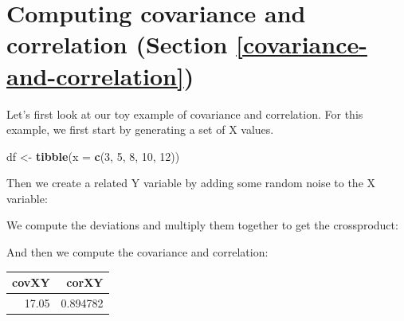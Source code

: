 \documentclass[12pt,]{book}
\newenvironment{Shaded}{\begin{snugshade}}{\end{snugshade}}
\newcommand{\DataTypeTok}[1]{\textcolor[rgb]{0.13,0.29,0.53}{#1}}
\newcommand{\DecValTok}[1]{\textcolor[rgb]{0.00,0.00,0.81}{#1}}
\newcommand{\KeywordTok}[1]{\textcolor[rgb]{0.13,0.29,0.53}{\textbf{#1}}}
\newcommand{\NormalTok}[1]{#1}
\newcommand{\OperatorTok}[1]{\textcolor[rgb]{0.81,0.36,0.00}{\textbf{#1}}}
\newcommand{\StringTok}[1]{\textcolor[rgb]{0.31,0.60,0.02}{#1}}
\begin{document}
\hypertarget{computing-covariance-and-correlation-section-refcovariance-and-correlation}{%
\section{Computing covariance and correlation (Section \ref{covariance-and-correlation})}\label{computing-covariance-and-correlation-section-refcovariance-and-correlation}}

Let's first look at our toy example of covariance and correlation. For this example, we first start by generating a set of X values.

\begin{Shaded}
\begin{Highlighting}[]
\NormalTok{df <-}
\StringTok{  }\KeywordTok{tibble}\NormalTok{(}\DataTypeTok{x =} \KeywordTok{c}\NormalTok{(}\DecValTok{3}\NormalTok{, }\DecValTok{5}\NormalTok{, }\DecValTok{8}\NormalTok{, }\DecValTok{10}\NormalTok{, }\DecValTok{12}\NormalTok{))}
\end{Highlighting}
\end{Shaded}

Then we create a related Y variable by adding some random noise to the X variable:

We compute the deviations and multiply them together to get the crossproduct:

And then we compute the covariance and correlation:

\begin{Shaded}
\end{Shaded}

\begin{tabular}{r|r}
\hline
covXY & corXY\\
\hline
17.05 & 0.894782\\
\hline
\end{tabular}
\end{document}
